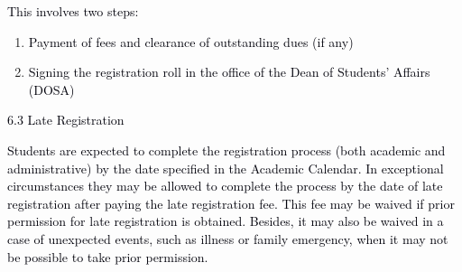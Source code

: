 \documentclass[12pt]{article}
\begin{document}
\vspace{\baselineskip}
{\fontsize{10pt}{12.0pt}\selectfont \textcolor[HTML]{00000A}{This involves two steps:}\par}\par


\vspace{\baselineskip}
\begin{enumerate}
	\item {\fontsize{10pt}{12.0pt}\selectfont \textcolor[HTML]{00000A}{Payment of fees and clearance of outstanding dues (if any)}\par}\par


\vspace{\baselineskip}
	\item {\fontsize{10pt}{12.0pt}\selectfont \textcolor[HTML]{00000A}{Signing the registration roll in the office of the Dean of Students’ Affairs (DOSA)}\par}
\end{enumerate}\par


\vspace{\baselineskip}
\textcolor[HTML]{00000A}{6.3 Late Registration}\par


\vspace{\baselineskip}
\begin{justify}
{\fontsize{10pt}{12.0pt}\selectfont \textcolor[HTML]{00000A}{Students are expected to complete the registration process (both academic and administrative) by the date specified in the Academic Calendar. In exceptional circumstances they may be allowed to complete the process by the date of late registration after paying the late registration fee. This fee may be waived if prior permission for late registration is obtained. Besides, it may also be waived in a case of unexpected events, such as illness or family emergency, when it may not be possible to take prior permission.}\par}
\end{justify}\par


\vspace{\baselineskip}

\vspace{\baselineskip}

\vspace{\baselineskip}

\vspace{\baselineskip}
\end{document}
